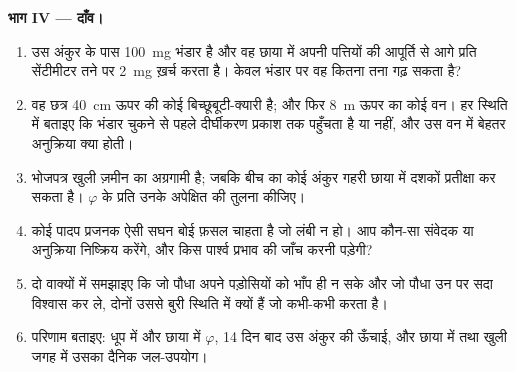 \begin{problem}
\medskip
\noindent\textbf{भाग IV --- दाँव।}
\begin{enumerate}[resume]
  \item उस अंकुर के पास \qty{100}{mg} भंडार है और वह छाया में अपनी
        पत्तियों की आपूर्ति से आगे प्रति सेंटीमीटर तने पर
        \qty{2}{mg} ख़र्च करता है। केवल भंडार पर वह कितना तना गढ़ सकता
        है?
  \item वह छत्र \qty{40}{cm} ऊपर की कोई बिच्छूबूटी-क्यारी है; और फिर
        \qty{8}{m} ऊपर का कोई वन। हर स्थिति में बताइए कि भंडार चुकने से
        पहले दीर्घीकरण प्रकाश तक पहुँचता है या नहीं, और उस वन में
        बेहतर अनुक्रिया क्या होती।
  \item भोजपत्र खुली ज़मीन का अग्रगामी है; जबकि बीच का कोई अंकुर गहरी
        छाया में दशकों प्रतीक्षा कर सकता है। $\varphi$ के प्रति उनके
        अपेक्षित  की तुलना कीजिए।
  \item कोई पादप प्रजनक ऐसी सघन बोई फ़सल चाहता है जो लंबी न हो। आप
        कौन-सा संवेदक या अनुक्रिया निष्क्रिय करेंगे, और किस पार्श्व
        प्रभाव की जाँच करनी पड़ेगी?
  \item दो वाक्यों में समझाइए कि जो पौधा अपने पड़ोसियों को भाँप ही न
        सके और जो पौधा उन पर सदा विश्वास कर ले, दोनों उससे बुरी स्थिति
        में क्यों हैं जो कभी-कभी करता है।
  \item परिणाम बताइए: धूप में और छाया में $\varphi$, 14 दिन बाद उस
        अंकुर की ऊँचाई, और छाया में तथा खुली जगह में उसका दैनिक जल-उपयोग।
\end{enumerate}
\end{problem}
